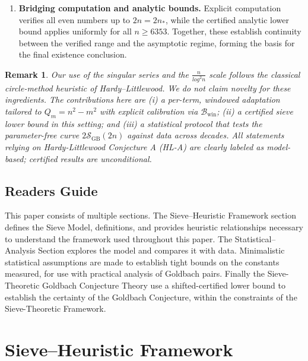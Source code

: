\documentclass[11pt]{article}
\theoremstyle{inline}
\newtheorem*{remark}{Remark}
\theoremstyle{break}
\theoremstyle{break}
\theoremstyle{break}
\theoremstyle{break}
\theoremstyle{break}
\theoremstyle{break}
\theoremstyle{break}
\theoremstyle{inline}
\newcommand{\xMertens}{6353} %
\newcommand{\twin}{{\scriptscriptstyle\mathrm{win}}}
\newcommand{\SGB}{\mathcal{S}_{\scriptscriptstyle\mathrm{GB}}}
\newcommand{\Bwin}{\mathcal{B}_\twin}
\begin{document}
\begin{enumerate}
  \item \textbf{Bridging computation and analytic bounds.}
  Explicit computation verifies all even numbers up to \(2n = 2n_\ast\),
  while the certified analytic lower bound applies uniformly for
  all \(n \ge \xMertens\).
  Together, these establish continuity between the verified range
  and the asymptotic regime, forming the basis for the final
  existence conclusion.
\end{enumerate}


\begin{remark}
Our use of the singular series and the \(  \frac{n}{log^2 n} \) scale follows the classical circle-method heuristic of Hardy–Littlewood.\cite{HardyLittlewood1923} We do not claim novelty for these ingredients. The contributions here are (i) a per-term, windowed adaptation tailored to \( Q_m = n^2 - m^2 \)  with explicit calibration via \( \Bwin \); (ii) a certified sieve lower bound in this setting; and (iii) a statistical protocol that tests the parameter-free curve \( 2\SGB(2n) \) against data across decades. All statements relying on Hardy-Littlewood Conjecture A (HL-A) are clearly labeled as model-based; certified results are unconditional.
\end{remark}


\subsection*{Readers Guide}
This paper consists of multiple sections.  The Sieve--Heuristic Framework section defines the Sieve Model, definitions, and provides heuristic relationships necessary to understand the framework used throughout this paper.   The Statistical--Analysis Section explores the model and compares it with data.  Minimalistic statistical assumptions are made to establish tight bounds on the constants measured, for use with practical analysis of Goldbach pairs.   Finally the Sieve-Theoretic Goldbach Conjecture Theory use a shifted-certified lower bound to establish the certainty of the Goldbach Conjecture, within the constraints of the Sieve-Theoretic Framework.


\section*{Sieve--Heuristic Framework}
\end{document}
